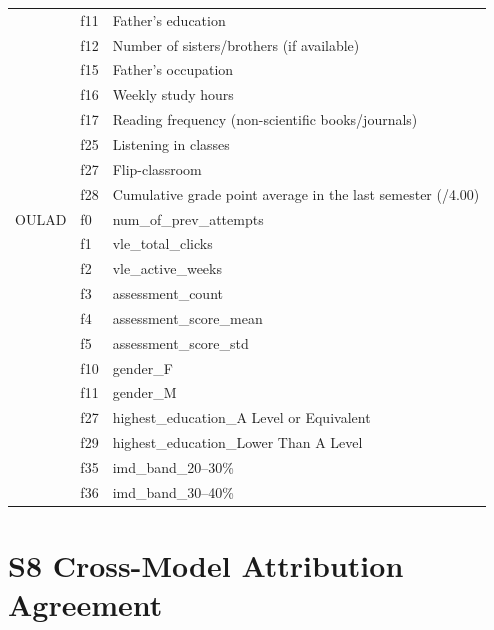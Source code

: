 \documentclass[10pt,letterpaper]{article}
\begin{document}
\begin{table}[H]
\begin{tabular}{l l l}
 & f11 & Father's education \\
 & f12 & Number of sisters/brothers (if available) \\
 & f15 & Father's occupation \\
 & f16 & Weekly study hours \\
 & f17 & Reading frequency (non-scientific books/journals) \\
 & f25 & Listening in classes \\
 & f27 & Flip-classroom \\
 & f28 & Cumulative grade point average in the last semester (/4.00) \\
\midrule
OULAD & f0 & num\_of\_prev\_attempts \\
 & f1 & vle\_total\_clicks \\
 & f2 & vle\_active\_weeks \\
 & f3 & assessment\_count \\
 & f4 & assessment\_score\_mean \\
 & f5 & assessment\_score\_std \\
 & f10 & gender\_F \\
 & f11 & gender\_M \\
 & f27 & highest\_education\_A Level or Equivalent \\
 & f29 & highest\_education\_Lower Than A Level \\
 & f35 & imd\_band\_20--30\% \\
 & f36 & imd\_band\_30--40\% \\
\bottomrule
\end{tabular}
\end{table}

\clearpage
\section*{S8 Cross-Model Attribution Agreement}
\end{document}
